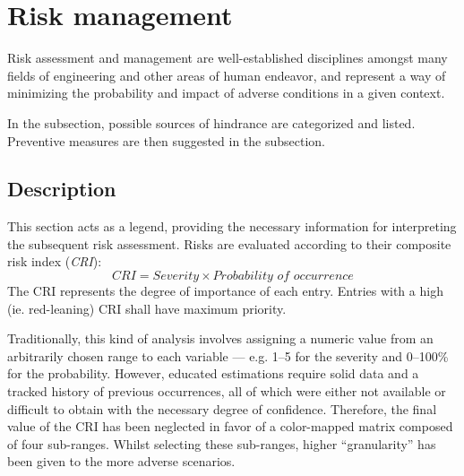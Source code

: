 \section{Risk management}

Risk assessment and management are well-established disciplines amongst many fields of engineering and other areas of human endeavor, and represent a way of minimizing the probability and impact of adverse conditions in a given context.

In the  subsection, possible sources of hindrance are categorized and listed.
Preventive measures are then suggested in the  subsection.


\subsection{Description}
This section acts as a legend, providing the necessary information for interpreting the subsequent risk assessment.
Risks are evaluated according to their composite risk index (\emph{CRI}):
\begin{equation}
    \textit{CRI} = \textit{Severity} \times \textit{Probability of occurrence}
\end{equation}
The CRI represents the degree of importance of each entry.
Entries with a high (ie. red-leaning) CRI shall have maximum priority.

Traditionally, this kind of analysis involves assigning a numeric value from an arbitrarily chosen range to each variable --- e.g. 1--5 for the severity and 0--100\% for the probability.
However, educated estimations require solid data and a tracked history of previous occurrences, all of which were either not available or difficult to obtain with the necessary degree of confidence. \cite{risk}
Therefore, the final value of the CRI has been neglected in favor of a color-mapped matrix composed of four sub-ranges.
Whilst selecting these sub-ranges, higher ``granularity'' has been given to the more adverse scenarios.

